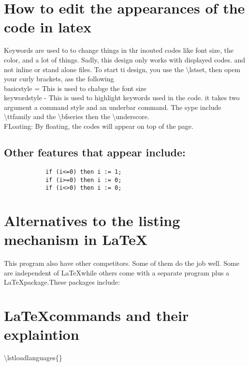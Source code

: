 \documentclass{article}
\begin{document}
	\section{How to edit the appearances of the code in latex}
		Keywords are used to to change things in thr inouted codes like font size, the color, and a lot of things.
		Sadly, this design only works with displayed codes. and not inline or stand alone files.
		To start ti design, you use the \textbackslash lstset, then opem your curly brackets, ass the following
		\\basicstyle = This is used to chabge the font size
		\\keywordstyle - This is used to highlight keywords  used in the code. it takes two argument a command style and an underbar command. The sype include \textbackslash ttfamily and the \textbackslash bfseries then the \textbackslash underscore.
		\\FLoating: By floating, the codes will appear on top of the page. 
	\subsection{Other features that appear include:}
		\begin{lstlisting}
			if (i<=0) then i := 1;
			if (i>=0) then i := 0;
			if (i<>0) then i := 0;
		\end{lstlisting}
		
	\section{Alternatives to the listing mechanism in \LaTeX }
	\paragraph{}
		This program also have other competitors. Some of them do the job well. Some are independent of \LaTeX while others come with a separate program plus a \LaTeX package.These packages include:
		\\
	\section{\LaTeX commands and their explaintion}
		\textbackslash{lstloadlanguages}\{<comma separated list of languages>\}
\end{document}
